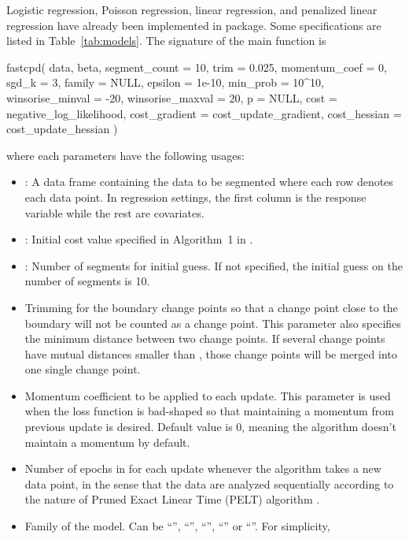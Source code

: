 \documentclass[article]{jss}
\newcommand{\fct}[1]{\code{#1()}}
\begin{document}
Logistic regression, Poisson regression, linear regression, and penalized
linear regression have already been implemented in  package. Some
specifications are listed in Table~\ref{tab:models}. The signature of the main
function \fct{fastcpd} is
%
\begin{Code}
fastcpd(
  data,
  beta,
  segment_count = 10,
  trim = 0.025,
  momentum_coef = 0,
  sgd_k = 3,
  family = NULL,
  epsilon = 1e-10,
  min_prob = 10^10,
  winsorise_minval = -20,
  winsorise_maxval = 20,
  p = NULL,
  cost = negative_log_likelihood,
  cost_gradient = cost_update_gradient,
  cost_hessian = cost_update_hessian
)
\end{Code}
%
where each parameters have the following usages:
\begin{itemize}
  \item {}: A data frame containing the data to be segmented where each
    row denotes each data point. In regression settings, the first column is the
    response variable while the rest are covariates.
  \item {}: Initial cost value specified in Algorithm~1 in
    \cite{zhang2022sequential}.
  \item {}: Number of segments for initial guess. If not
    specified, the initial guess on the number of segments is 10.
  \item {} Trimming for the boundary change points so that a change
    point close to the boundary will not be counted as a change point. This
    parameter also specifies the minimum distance between two change points. If
    several change points have mutual distances smaller than
    , those change points will be merged into one single
    change point.
  \item {} Momentum coefficient to be applied to each update.
    This parameter is used when the loss function is bad-shaped so that
    maintaining a momentum from previous update is desired. Default value is 0,
    meaning the algorithm doesn't maintain a momentum by default.
  \item {} Number of epochs in for each update whenever the algorithm
    takes a new data point, in the sense that the data are analyzed sequentially
    according to the nature of Pruned Exact Linear Time (PELT) algorithm
    \citep{killick2012optimal}.
  \item {} Family of the model. Can be ``'', ``'',
    ``'', ``'' or ``''. For simplicity,

\end{itemize}
\end{document}
